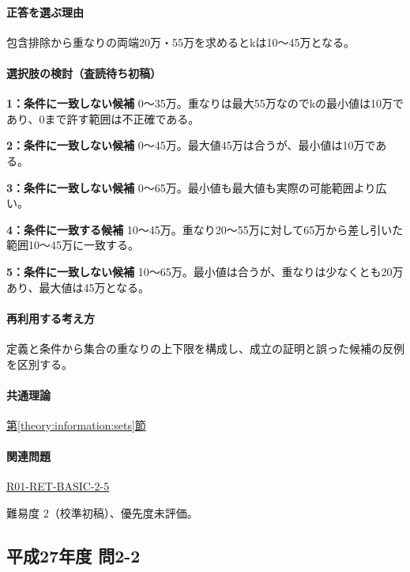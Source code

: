 \paragraph{正答を選ぶ理由} 包含排除から重なりの両端20万・55万を求めるとkは10〜45万となる。

\paragraph{選択肢の検討（査読待ち初稿）}\mbox{}\par

\noindent\textbf{1：条件に一致しない候補} 0〜35万。重なりは最大55万なのでkの最小値は10万であり、0まで許す範囲は不正確である。\par

\noindent\textbf{2：条件に一致しない候補} 0〜45万。最大値45万は合うが、最小値は10万である。\par

\noindent\textbf{3：条件に一致しない候補} 0〜65万。最小値も最大値も実際の可能範囲より広い。\par

\noindent\textbf{4：条件に一致する候補} 10〜45万。重なり20〜55万に対して65万から差し引いた範囲10〜45万に一致する。\par

\noindent\textbf{5：条件に一致しない候補} 10〜65万。最小値は合うが、重なりは少なくとも20万あり、最大値は45万となる。\par

\paragraph{再利用する考え方} 定義と条件から集合の重なりの上下限を構成し、成立の証明と誤った候補の反例を区別する。

\paragraph{共通理論} \hyperref[theory:information:sets]{第\ref*{theory:information:sets}節}

\paragraph{関連問題} \hyperref[q:r01-ret-basic-2-5]{R01-RET-BASIC-2-5}

\par 難易度 2（校準初稿）、優先度未評価。

\subsection{平成27年度 問2-2}
\label{q:h27-reg-basic-2-2}

